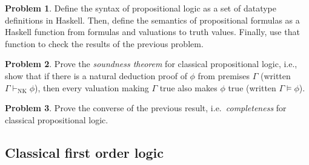 \documentclass[a4paper]{article}
\theoremstyle{definition}
\newtheorem{prob}{Problem}
\begin{document}
\begin{prob}\label{prob:haskell-prop}
Define the syntax of propositional logic as a set of datatype
definitions in Haskell. Then, define the semantics of propositional
formulas as a Haskell function from formulas and valuations to truth
values. 
Finally, use that function to check the results of the previous problem.
\end{prob}


\begin{prob}
Prove the \emph{soundness theorem} for classical propositional logic,
i.e., show that if there is a natural deduction proof of $\phi$ from
premises $\Gamma$ (written $\Gamma \vdash_{\text{NK}} \phi$), then
every valuation making $\Gamma$ true also makes $\phi$ true 
(written $\Gamma \models \phi$).
\end{prob}


\begin{prob}
Prove the converse of the previous result, i.e.~\emph{completeness}
for classical propositional logic. 
\end{prob}



\subsection*{Classical first order logic}
\end{document}

